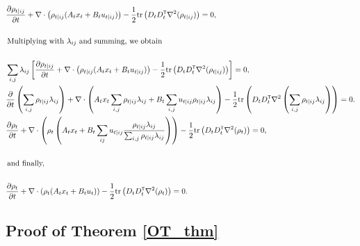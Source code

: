 \documentclass[twoside]{article}
\renewcommand{\t}{^{\mbox{\tiny\sf T}}} %
\newcommand{\tr}{\mathrm{tr}}
\newcommand{\hess}{\nabla^2}
\begin{document}
\begin{subequations}
    \begin{align}
         & \frac{\partial \rho_{t|ij}}{\partial t} + \nabla \cdot \left( \rho_{t|ij}(A_t x_t + B_t u_{t|ij}) \right) - \frac{1}{2} \tr \left( D_t D_t\t \hess(\rho_{t|ij}) \right) = 0, \\
         & \nonumber \\
         & \textrm{\! Multiplying with $\lambda_{ij}$ and summing, we obtain} \nonumber \\
         & \nonumber \\
         &  \sum_{i,j} \lambda_{ij} \left[ \frac{\partial \rho_{t|ij}}{\partial t} + \nabla \cdot \left( \rho_{t|ij}(A_t x_t + B_t u_{t|ij} ) \right) - \frac{1}{2} \tr \left( D_t D_t\t \hess(\rho_{t|ij}) \right) \right] = 0,  \\
         & \frac{\partial}{\partial t} \left( \sum_{i,j} \rho_{t|ij} \lambda_{ij} \right) + \nabla \cdot \left(  A_t x_t \sum_{i,j} \rho_{t|ij} \lambda_{ij} + B_t \sum_{i,j} u_{t|ij} \rho_{t|ij} \lambda_{ij}  \right) - \frac{1}{2} \tr \left( D_t D_t\t \hess \left( \sum_{i,j} \rho_{t|ij} \lambda_{ij} \right) \right) = 0.  \label{feas:step3} \\
         & \frac{\partial \rho_t}{\partial t} + \nabla \cdot \left( \rho_t \left( A_t x_t + B_t \sum_{ij} u_{t|ij}\frac{\rho_{t|ij} \lambda_{ij} }{\sum_{i,j} \rho_{t|ij} \lambda_{ij}} \right) \right) - \frac{1}{2} \tr \left( D_t D_t\t \hess(\rho_{t}) \right) = 0, \\
         & \nonumber \\
         & \textrm{\! and finally,} \nonumber \\
         & \nonumber \\
         & \frac{\partial \rho_t}{\partial t} + \nabla \cdot \left( \rho_t (A_t x_t + B_t u_t) \right) - \frac{1}{2} \tr \left( D_t D_t\t \hess(\rho_{t}) \right) = 0.
    \end{align}
\end{subequations}
 
%
\subsection{Proof of Theorem \ref{OT_thm}}
\end{document}
